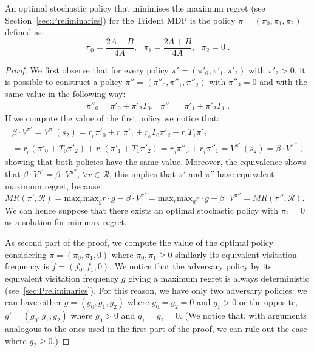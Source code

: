 \begin{proposition}\label{theorem:opt_stoc}
An optimal stochastic policy that minimises the maximum regret (see Section~\ref{sec:Preliminaries}) for the Trident MDP is the policy $\tilde{\pi} = (\pi_0, \pi_1, \pi_2)$ defined as:
$$\pi_{0}=\dfrac{2A - B}{4A},~~~\pi_{1}=\dfrac{2A + B}{4A}, ~~~\pi_2 = 0\;.$$
\end{proposition}
\begin{proof}
We first observe that for every policy $\pi' = (\pi'_0, \pi'_1, \pi'_2)$ with $\pi'_2 > 0$, it is possible to construct a policy $\pi'' = (\pi''_0, \pi''_1, \pi''_2)$ with $\pi''_2 = 0$ and with the same value in the following way:
\vspace{-0.2cm}
\begin{align*}
\pi''_0 = \pi'_0 + \pi'_2 T_0, ~~~ \pi''_1 = \pi'_1 + \pi'_2 T_1\;.
\end{align*}
If we compute the value of the first policy we notice that:
\vspace{-0.2cm}
\begin{align*}
\beta \cdot V^{\pi'} = V^{\pi'}(s_2) =
r_{_0} \pi'_0 + r_{_1}\pi'_1 + r_{_0} T_0 \pi'_2 + r_{_1} T_1 \pi'_2 \\
= r_{_0} (\pi'_0 + T_0 \pi'_2) + r_{_1} (\pi'_1 + T_1 \pi'_2)
= r_{_0} \pi''_0 + r_{_1}\pi''_1 = V^{\pi''}(s_2) =\beta \cdot V^{\pi''}\;,
\end{align*}
showing that both policies have the same value.
Moreover, the equivalence shows that  $\beta \cdot V^{\pi'}= \beta \cdot V^{\pi''}$, $\forall r \in \mathcal{R}$,
this implies that
$\pi'$ and $\pi''$ have equivalent maximum regret, because: $MR(\pi', \mathcal{R}) = \text{max}_{r} \text{max}_g r \cdot g - \beta \cdot V^{\pi'} = \text{max}_{r} \text{max}_g r \cdot g - \beta \cdot V^{\pi''} = MR(\pi'', \mathcal{R})$.
We can hence suppose that there exists an optimal stochastic policy with $\pi_2 =0$ as a solution for minimax regret. 

As second part of the proof, we compute the value of the optimal policy considering $\tilde{\pi} = (\pi_0, \pi_1, 0)$ where $\pi_0, \pi_1 \geq 0$ similarly its equivalent visitation frequency is $\tilde{f} = (f_0, f_1, 0)$. 
We notice that the adversary policy by its equivalent visitation frequency $g$ giving a maximum regret is always deterministic (see~\ref{sec:Preliminaries}). For this reason, we have only two adversary policies: we can have either $g = (g_0, g_1, g_2)$ where $g_0 = g_2=0$ and $g_1 > 0$ or the opposite, $g' = (g_0, g_1, g_2)$ where $g_0>0$ and $g_1 = g_2 = 0$. (We notice that, with arguments analogous to the ones used in the first part of the proof, we can rule out the case where $g_2 \geq 0$.)


\end{proof}

